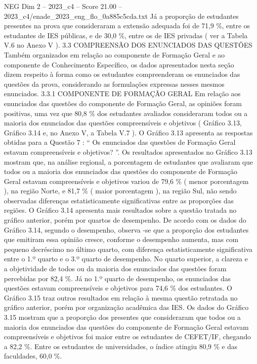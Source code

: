 \begin{textsample}{NEG Dim 2 – 2023\_c4 – Score 21.00 – 2023\_c4/enade\_2023\_eng\_flo\_0a885c5cda.txt}
Já a proporção de estudantes presentes na prova que consideraram a extensão adequada foi de 71,9 \%, entre os estudantes de IES públicas, e de 30,0 \%, entre os de IES privadas ( ver a Tabela V.6 no Anexo V ). 3.3 COMPREENSÃO DOS ENUNCIADOS DAS QUESTÕES Também organizados em relação ao componente de Formação Geral e ao componente de Conhecimento Específico, os dados apresentados nesta seção dizem respeito à forma como os estudantes compreenderam os enunciados das questões da prova, considerando as formulações expressas nesses mesmos enunciados. 3.3.1 COMPONENTE DE FORMAÇÃO GERAL Em relação aos enunciados das questões do componente de Formação Geral, as opiniões foram positivas, uma vez que 80,8 \% dos estudantes avaliados consideraram todos ou a maioria dos enunciados das questões compreensíveis e objetivos ( Gráfico 3.13, Gráfico 3.14 e, no Anexo V, a Tabela V.7 ).
O Gráfico 3.13 apresenta as respostas obtidas para a Questão 7 : “ Os enunciados das questões de Formação Geral estavam compreensíveis e objetivos? ”.
Os resultados apresentados no Gráfico 3.13 mostram que, na análise regional, a porcentagem de estudantes que avaliaram que todos ou a maioria dos enunciados das questões do componente de Formação Geral estavam compreensíveis e objetivos variou de 79,6 \% ( menor porcentagem ), na região Norte, e 81,7 \% ( maior porcentagem ), na região Sul, não sendo observadas diferenças estatisticamente significativas entre as proporções das regiões.
O Gráfico 3.14 apresenta mais resultados sobre a questão tratada no gráfico anterior, porém por quartos de desempenho.
De acordo com os dados do Gráfico 3.14, segundo o desempenho, observa -se que a proporção dos estudantes que emitiram essa opinião cresce, conforme o desempenho aumenta, mas com pequeno decréscimo no último quarto, com diferença estatisticamente significativa entre o 1.º quarto e o 3.º quarto de desempenho.
No quarto superior, a clareza e a objetividade de todos ou da maioria dos enunciados das questões foram percebidas por 82,4 \%.
Já no 1.º quarto de desempenho, os enunciados das questões estavam compreensíveis e objetivos para 74,6 \% dos estudantes.
O Gráfico 3.15 traz outros resultados em relação à mesma questão retratada no gráfico anterior, porém por organização acadêmica das IES.
Os dados do Gráfico 3.15 mostram que a proporção dos presentes que consideraram que todos ou a maioria dos enunciados das questões do componente de Formação Geral estavam compreensíveis e objetivos foi maior entre os estudantes de CEFET/IF, chegando a 82,2 \%.
Entre os estudantes de universidades, o índice atingiu 80,9 \% e das faculdades, 60,0 \%.

\end{textsample}
